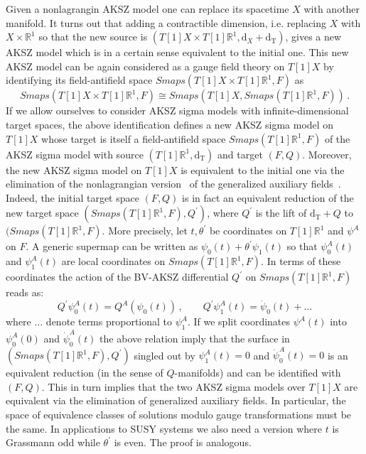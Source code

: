 \documentclass[a4paper,12pt]{article}
\numberwithin{equation}{section} %
\renewcommand{\simeq}{\cong}
\newcommand{\dx}{\mathrm{d}_X}
\newcommand{\fR}{\mathbb{R}}
\numberwithin{equation}{section}
\newcommand{\dT}{\mathrm{d_T}}
\begin{document}
Given a nonlagrangin AKSZ model one can replace its spacetime  $X$ with another manifold. It turns out that adding a contractible dimension, i.e. replacing $X$ with $X \times \fR^1$ so that the new source is $(T[1]X\times T[1]\fR^1,\dx+\dT)$, gives a new AKSZ model which is in a certain sense equivalent to the initial one. This new AKSZ model can be again considered as a gauge field theory on $T[1]X$ by identifying its field-antifield space $Smaps(T[1]X\times T[1]\fR^1,F)$ as
\begin{equation}
Smaps(T[1]X\times T[1]\fR^1,F)\simeq Smaps(T[1]X, Smaps( T[1]\fR^1,F))\,.
\end{equation}
If we allow ourselves to consider AKSZ sigma models with infinite-dimensional target spaces, the above identification defines a new AKSZ sigma model on $T[1]X$ whose target is itself a field-antifield space $Smaps(T[1]\fR^1,F)$ of the  AKSZ sigma model with source $(T[1]\fR^1,\dT)$
and target $(F,Q)$. Moreover, the new AKSZ sigma model on $T[1]X$ is equivalent to the initial one via the elimination of the nonlagrangian version~\cite{Barnich:2004cr,Barnich:2010sw,Grigoriev:2019ojp}  of the generalized auxiliary fields~\cite{Henneaux:1990ua}. Indeed, the initial target space $(F,Q)$ is in fact an equivalent reduction of the new target space $(Smaps( T[1]\fR^1,F),Q^\prime)$, where $Q^\prime$ is the lift of $\dT+Q$ to $(Smaps( T[1]\fR^1,F)$. More precisely, let $t,\theta^\prime$ be coordinates on $T[1]\fR^1$ and $\psi^A$ on $F$. A generic supermap can be written as $\psi_0(t)+\theta^\prime \psi_1(t)$ so that $\psi_0^A(t)$ and $\psi_1^A(t)$ are local coordinates on $Smaps(T[1]\fR^1,F)$. In terms of these coordinates the action of the BV-AKSZ differential $Q^\prime$ on $Smaps( T[1]\fR^1,F)$ reads as:
\begin{equation}
\label{c-pairs}
Q^\prime \psi_0^A(t)=Q^A(\psi_0(t))\,, \qquad Q^\prime \psi_1^A(t)=\dot \psi_0(t)+\ldots
\end{equation}
where $\ldots$ denote terms proportional to $\psi_1^A$. If we split coordinates $\psi^A(t)$ into $\psi_0^A(0)$ and $\dot\psi_0^A(t)$ the above relation imply that the surface in $(Smaps( T[1]\fR^1,F),Q^\prime)$ singled out by $\psi_1^A(t)=0$ and $\dot\psi_0^A(t)=0$ is an equivalent reduction (in the sense of $Q$-manifolds) and can be identified with $(F,Q)$. This in turn implies that the two AKSZ sigma models over $T[1]X$ are equivalent via the elimination of generalized auxiliary fields. In particular, the space of equivalence classes of solutions modulo gauge transformations must be the same. In applications to SUSY systems we also need a version where $t$ is Grassmann odd while $\theta^\prime$ is even. The proof is analogous.
\end{document}
